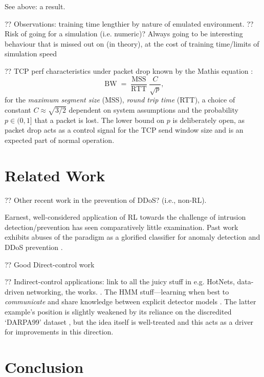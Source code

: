\documentclass[conference, letterpaper, 10pt, times]{IEEEtran}
\begin{document}
See above: a result.

?? Observations: training time lengthier by nature of emulated environment.
?? Risk of going for a simulation (i.e. numeric)? Always going to be interesting behaviour that is missed out on (in theory), at the cost of training time/limits of simulation speed

?? TCP perf characteristics under packet drop known by the Mathis equation \cite{DBLP:journals/ccr/MathisSMO97}:
$$ \operatorname{BW} = \frac{\operatorname{MSS}}{\operatorname{RTT}} \frac{C}{\sqrt{p}},$$
for the \emph{maximum segment size} (MSS), \emph{round trip time} (RTT), a choice of constant $C \approx{} \sqrt{3/2}$ dependent on system assumptions and the probability $p \in (0, 1]$ that a packet is lost.
The lower bound on $p$ is deliberately open, as packet drop acts as a control signal for the TCP send window size and is an expected part of normal operation.

\section{Related Work}

?? Other recent work in the prevention of DDoS? (i.e., non-RL).

Earnest, well-considered application of RL towards the challenge of intrusion detection/prevention has seen comparatively little examination.
Past work exhibits abuses of the paradigm as a glorified classifier for anomaly detection \cite{shamshirband2014anomaly} and DDoS prevention \cite{DBLP:conf/mates/ServinK08}.

?? Good Direct-control work \cite{DBLP:phd/ethos/Malialis14, DBLP:journals/eaai/MalialisK15}

?? Indirect-control applications: link to all the juicy stuff in e.g. HotNets, data-driven networking, the works. \cite{DBLP:conf/hotnets/ValadarskySST17, DBLP:conf/hotnets/MaoAMK16}.
The HMM stuff---learning when best to \emph{communicate} and share knowledge between explicit detector models \cite{DBLP:conf/paisi/XuSH07}.
The latter example's position is slightly weakened by its reliance on the discredited `DARPA99' dataset \cite{DARPA-IDD, DBLP:conf/cisda/TavallaeeBLG09, DBLP:conf/sp/SommerP10}, but the idea itself is well-treated and this acts as a driver for improvements in this direction.

\section{Conclusion}
\end{document}
